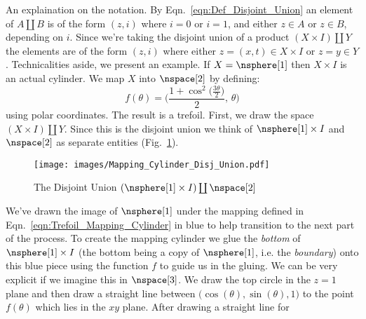 \documentclass{book}                                                           %
\begin{document}
                An explaination on the notation. By
                Eqn.~\ref{eqn:Def_Disjoint_Union} an element of $A\coprod{B}$ is
                of the form $(z,i)$ where $i=0$ or $i=1$, and either $z\in{A}$
                or $z\in{B}$, depending on $i$. Since we're taking the disjoint
                union of a product $(X\times{I})\coprod{Y}$ the elements are of
                the form $(z,i)$ where either $z=(x,t)\in{X}\times{I}$ or
                $z=y\in{Y}$. Technicalities aside, we present an example. If
                $X=\nsphere[1]$ then $X\times{I}$ is an actual cylinder. We map
                $X$ into $\nspace[2]$ by defining:
                \begin{equation}
                    \label{eqn:Trefoil_Mapping_Cylinder}%
                    f(\theta)=\Big(
                        \frac{1+\cos^{2}\big(\frac{3\theta}{2}\big)}{2},\,
                        \theta
                    \Big)
                \end{equation}
                using polar coordinates. The result is a trefoil. First, we draw
                the space $(X\times{I})\coprod{Y}$. Since this is
                the disjoint union we think of $\nsphere[1]\times{I}$ and
                $\nspace[2]$ as separate entities
                (Fig.~\ref{fig:Ex_Mapping_Cylinder_Disj_Union}).
                \begin{figure}
                    \centering
                    \captionsetup{type=figure}
                    \texttt{[image: images/Mapping\_Cylinder\_Disj\_Union.pdf]}
                    \caption{The Disjoint Union
                             $(\nsphere[1]\times{I})\coprod\nspace[2]$}
                    \label{fig:Ex_Mapping_Cylinder_Disj_Union}
                \end{figure}
                We've drawn the image of $\nsphere[1]$ under the mapping
                defined in Eqn.~\ref{eqn:Trefoil_Mapping_Cylinder} in blue to
                help transition to the next part of the process. To create the
                mapping cylinder we glue the \textit{bottom} of
                $\nsphere[1]\times{I}$ (the bottom being a copy of
                $\nsphere[1]$, i.e. the \textit{boundary}) onto this blue piece
                using the function $f$ to guide us in the gluing. We can be very
                explicit if we imagine this in $\nspace[3]$. We draw the top
                circle in the $z=1$ plane and then draw a straight line between
                $\big(\cos(\theta),\sin(\theta),1\big)$ to the point $f(\theta)$
                which lies in the $xy$ plane. After drawing a straight line for
\end{document}
